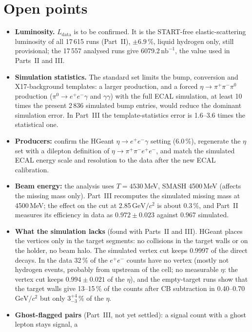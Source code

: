 \documentclass[11pt,a4paper]{article}
\newcommand{\piz}{\ensuremath{\pi^{0}}\xspace}
\newcommand{\ee}{\ensuremath{e^{+}e^{-}}\xspace}
\newcommand{\pipi}{\ensuremath{\pi^{+}\pi^{-}}\xspace}
\newcommand{\ppee}{\ensuremath{\pi^{+}\pi^{-}e^{+}e^{-}}\xspace}
\newcommand{\nbinv}{\ensuremath{\mathrm{nb}^{-1}}\xspace}
\newcommand{\GeVcc}{\ensuremath{\mathrm{GeV}/c^{2}}\xspace}
\newcommand{\Ldata}{\ensuremath{L_{\mathrm{data}}}\xspace}
\begin{document}
\section{Open points}
\label{sec:open}
\begin{itemize}
\item \textbf{Luminosity.} \Ldata is to be confirmed. It is the START-free elastic-scattering luminosity of all 17\,615 runs
      (Part~II), $\pm6.9$\,\%, liquid hydrogen only, still provisional; the 17\,557 analysed runs give 6079.2\,\nbinv, the value
      used in Parts~II and III.
\item \textbf{Simulation statistics.} The standard set limits the bump, conversion and X17-background templates: a larger
      production, and a forced $\eta\to\pipi\piz$ production ($\piz\to\ee\gamma$ and $\gamma\gamma$) with the full ECAL
      simulation, at least 10 times the present 2\,836 simulated bump entries, would reduce the dominant simulation error.
      In Part~III the template-statistics error is 1.6--3.6 times the statistical one.
\item \textbf{Producers:} confirm the HGeant $\eta\to\ee\gamma$ setting (6.0\,\%), regenerate the $\eta$ set with a
      dilepton definition of $\eta\to\ppee$, and match the simulated ECAL energy scale and resolution to the data after the
      new ECAL calibration.
\item \textbf{Beam energy:} the analysis uses $T = 4530$\,MeV, SMASH 4500\,MeV (affects the missing mass only). Part~III
      recomputes the simulated missing mass at 4500\,MeV; the effect on the cut at 2.85\,\GeVcc is about 0.3\,\%, and Part~II
      measures its efficiency in data as $0.972\pm0.023$ against 0.967 simulated.
\item \textbf{What the simulation lacks} (found with Parts~II and III). HGeant places the vertices only in the target
      segments: no collisions in the target walls or on the holder, no beam halo. The simulated vertex cut keeps 0.9997 of
      the direct decays. In the data 32\,\% of the \ee counts have no vertex (mostly not hydrogen events, probably from
      upstream of the cell; no measurable $\eta$: the vertex cut keeps $0.994\pm0.021$ of the $\eta$), and the empty-target runs show that the target walls give 13--15\,\% of
      the counts after CB subtraction in 0.40--0.70\,\GeVcc but only $3^{+4}_{-3}$\,\% of the $\eta$.
\item \textbf{Ghost-flagged pairs} (Part~III, not yet settled): a signal count with a ghost lepton stays signal, a

\end{itemize}
\end{document}
